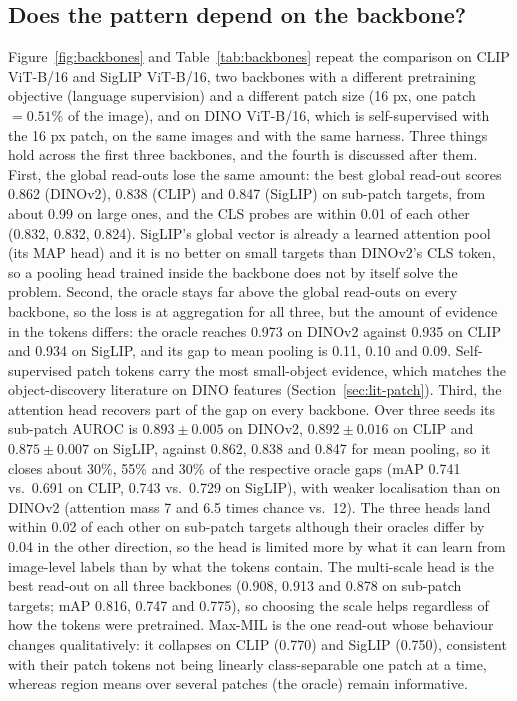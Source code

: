 \documentclass[10pt,letterpaper,twocolumn]{article}
\begin{document}
\subsection{Does the pattern depend on the backbone?}
\label{sec:backbones-results}
Figure~\ref{fig:backbones} and Table~\ref{tab:backbones} repeat the comparison on CLIP
ViT-B/16 and SigLIP ViT-B/16, two backbones with a different pretraining objective (language
supervision) and a different patch size (16 px, one patch $=0.51\%$ of the image), and on DINO
ViT-B/16, which is self-supervised with the 16 px patch, on the same images and with the same
harness. Three things hold across the first three backbones, and the fourth is discussed after them. First, the
global read-outs lose the same amount: the best global read-out scores 0.862 (DINOv2), 0.838
(CLIP) and 0.847 (SigLIP) on sub-patch targets, from about 0.99 on large ones, and the CLS
probes are within 0.01 of each other (0.832, 0.832, 0.824). SigLIP's global vector is already a
learned attention pool (its MAP head) and it is no better on small targets than DINOv2's CLS
token, so a pooling head trained inside the backbone does not by itself solve the problem.
Second, the oracle stays far above the global read-outs on every backbone, so the loss is at
aggregation for all three, but the amount of evidence in the tokens differs: the oracle
reaches 0.973 on DINOv2 against 0.935 on CLIP and 0.934 on SigLIP, and its gap to mean
pooling is 0.11, 0.10 and 0.09. Self-supervised patch tokens carry the most small-object
evidence, which matches the object-discovery literature on DINO features
(Section~\ref{sec:lit-patch}). Third, the attention head recovers part of the gap on every
backbone. Over three seeds its sub-patch AUROC is $0.893\pm0.005$ on DINOv2, $0.892\pm0.016$
on CLIP and $0.875\pm0.007$ on SigLIP, against 0.862, 0.838 and 0.847 for mean pooling, so it
closes about 30\%, 55\% and 30\% of the respective oracle gaps (mAP 0.741 vs.\ 0.691 on CLIP,
0.743 vs.\ 0.729 on SigLIP), with weaker localisation than on DINOv2 (attention mass 7 and
6.5 times chance vs.\ 12). The three heads land within 0.02 of each other on sub-patch
targets although their oracles differ by 0.04 in the other direction, so the head is limited
more by what it can learn from image-level labels than by what the tokens contain. The multi-scale head is the best read-out on all three backbones
(0.908, 0.913 and 0.878 on sub-patch targets; mAP 0.816, 0.747 and 0.775), so choosing the
scale helps regardless of how the tokens were pretrained. Max-MIL is the one read-out whose behaviour changes qualitatively: it
collapses on CLIP (0.770) and SigLIP (0.750), consistent with their patch tokens not being
linearly class-separable one patch at a time, whereas region means over several patches (the
oracle) remain informative.
\end{document}
